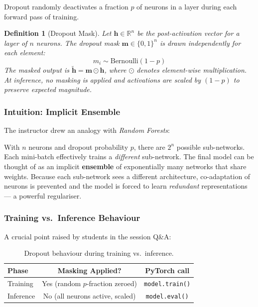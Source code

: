 \documentclass[12pt,a4paper]{article}
\newtheorem{definition}{Definition}[section]
\begin{document}
Dropout \cite{srivastava2014dropout} randomly deactivates a fraction $p$ of
neurons in a layer during each forward pass of training.

\begin{definition}[Dropout Mask]
  \label{def:dropout_mask}
  Let $\mathbf{h} \in \mathbb{R}^n$ be the post-activation vector for a
  layer of $n$ neurons.  The dropout mask $\mathbf{m} \in \{0,1\}^n$ is
  drawn independently for each element:
  \[
    m_i \sim \mathrm{Bernoulli}(1-p)
  \]
  The masked output is $\tilde{\mathbf{h}} = \mathbf{m} \odot \mathbf{h}$,
  where $\odot$ denotes element-wise multiplication.  At inference, no
  masking is applied and activations are scaled by $(1-p)$ to preserve
  expected magnitude.
\end{definition}

\subsubsection{Intuition: Implicit Ensemble}
\label{sec:regularisation:dropout:intuition}

The instructor drew an analogy with \emph{Random Forests}:

\begin{keyinsight}
  With $n$ neurons and dropout probability $p$, there are $2^n$ possible
  sub-networks.  Each mini-batch effectively trains a \emph{different}
  sub-network.  The final model can be thought of as an implicit
  \textbf{ensemble} of exponentially many networks that share weights.
  Because each sub-network sees a different architecture, co-adaptation of
  neurons is prevented and the model is forced to learn \emph{redundant}
  representations --- a powerful regulariser.
\end{keyinsight}

\subsubsection{Training vs.\ Inference Behaviour}
\label{sec:regularisation:dropout:train_vs_test}

A crucial point raised by students in the session Q\&A:

\begin{table}[htbp]
  \centering
  \caption{Dropout behaviour during training vs.\ inference.}
  \label{tab:dropout_mode}
  \begin{tabular}{lcc}
    \toprule
    \textbf{Phase} & \textbf{Masking Applied?} & \textbf{PyTorch call} \\
    \midrule
    Training   & Yes (random $p$-fraction zeroed) & \texttt{model.train()} \\
    Inference  & No (all neurons active, scaled)  & \texttt{model.eval()}  \\
    \bottomrule
  \end{tabular}
\end{table}
\end{document}
